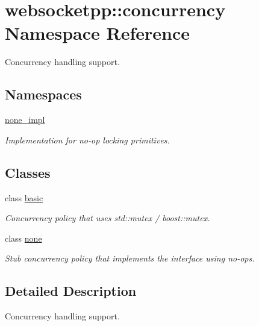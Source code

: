 \hypertarget{namespacewebsocketpp_1_1concurrency}{}\section{websocketpp\+:\+:concurrency Namespace Reference}
\label{namespacewebsocketpp_1_1concurrency}


Concurrency handling support.  


\subsection*{Namespaces}
\begin{DoxyCompactItemize}
\item 
 \hyperlink{namespacewebsocketpp_1_1concurrency_1_1none__impl}{none\+\_\+impl}
\begin{DoxyCompactList}\small\item\em Implementation for no-\/op locking primitives. \end{DoxyCompactList}\end{DoxyCompactItemize}
\subsection*{Classes}
\begin{DoxyCompactItemize}
\item 
class \hyperlink{classwebsocketpp_1_1concurrency_1_1basic}{basic}
\begin{DoxyCompactList}\small\item\em Concurrency policy that uses std\+::mutex / boost\+::mutex. \end{DoxyCompactList}\item 
class \hyperlink{classwebsocketpp_1_1concurrency_1_1none}{none}
\begin{DoxyCompactList}\small\item\em Stub concurrency policy that implements the interface using no-\/ops. \end{DoxyCompactList}\end{DoxyCompactItemize}


\subsection{Detailed Description}
Concurrency handling support. 